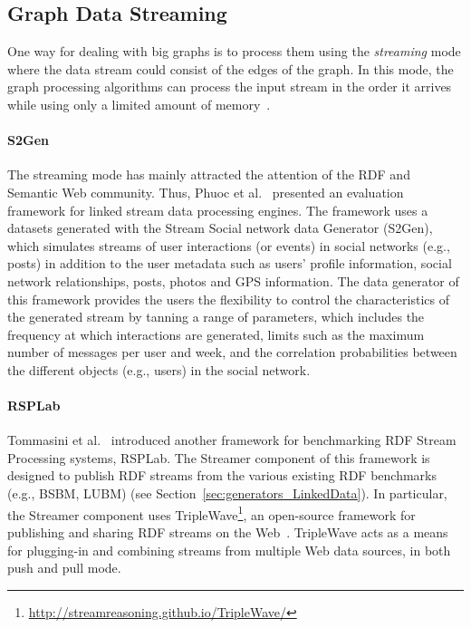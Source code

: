 \subsection{Graph Data Streaming}
\label{sec:generators_streaming}
One way for dealing with big graphs is to process them using the
\emph{streaming} mode where the data stream could consist of the edges of the
graph. In this mode, the graph processing algorithms can process the input
stream in the order it arrives while using only a limited amount of
memory~\cite{mcgregor2014graph}. 

\paragraph{S2Gen}  The streaming mode has mainly  attracted the attention of the
RDF and Semantic Web community. Thus, Phuoc et al.~\cite{le2012linked} presented
an evaluation framework for linked stream data processing engines. The framework
uses a datasets generated with the Stream Social network data Generator
(S2Gen), which 
simulates streams of user interactions (or events) in social networks 
(e.g., posts) in addition to the  user metadata such as users' profile
information, social network relationships, posts, photos and GPS information.
The data generator of this framework provides the users the flexibility to
control the characteristics of the generated stream by tanning a range of
parameters, which includes the frequency at which interactions are generated, 
limits such as the maximum number of messages per user
and week, and the correlation probabilities between the different objects (e.g.,
users) in the social network.

\paragraph{RSPLab} Tommasini et al.~\cite{tommasini2017rsplab} introduced
another framework for benchmarking RDF Stream Processing systems, RSPLab. The
Streamer component of this framework is designed to publish RDF streams from the
various existing RDF benchmarks (e.g., BSBM, LUBM) (see Section~\ref{sec:generators_LinkedData}).
In particular, the Streamer  component uses TripleWave\footnote{\url{http://streamreasoning.github.io/TripleWave/}}, an
open-source framework for publishing and sharing RDF streams on the
Web~\cite{mauri2016triplewave}.   TripleWave acts as a means for plugging-in
and combining streams from multiple Web data sources, in both push and pull mode.
